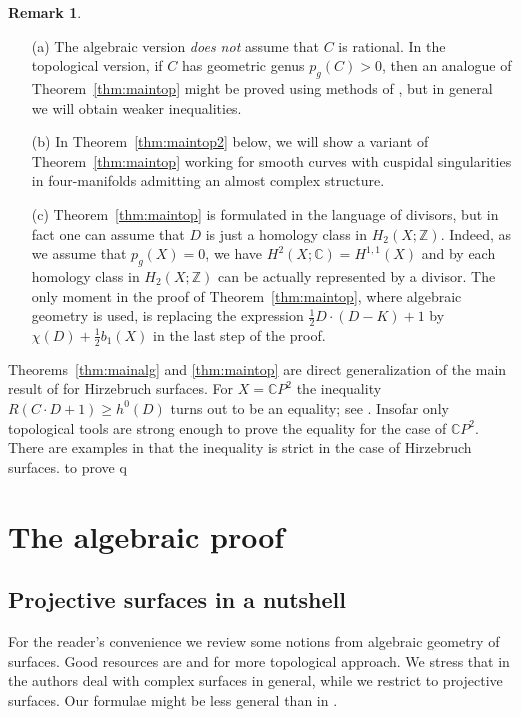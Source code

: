\documentclass[11pt]{amsart}
\numberwithin{equation}{section}
\theoremstyle{plain}
\theoremstyle{definition}
\newtheorem{remark}[equation]{Remark}
\begin{document}
\begin{remark}\label{rem:aftertop}\
\begin{itemize}
\item[(a)] The algebraic version \emph{does not} assume that $C$ is rational. 
In the topological version, if $C$ has geometric genus $p_g(C)>0$, then an analogue of Theorem~\ref{thm:maintop} might be proved
using methods of \cite{BCG,BHL}, but in general we will obtain weaker inequalities.
\item[(b)] 
In Theorem~\ref{thm:maintop2} below, we will show a variant of Theorem~\ref{thm:maintop} working for smooth curves with cuspidal singularities
in four-manifolds admitting an almost complex structure.
\item[(c)] Theorem~\ref{thm:maintop} is formulated in the language of divisors, but in fact one can assume that $D$ is just a homology class
in $H_2(X;{\mathbb Z})$. Indeed, as we assume that $p_g(X)=0$, we have $H^2(X;{\mathbb C})=H^{1,1}(X)$ 
and by \cite[Theorem IV.2.13]{BH} each homology class in $H_2(X;{\mathbb Z})$ can
be actually represented by a divisor. The only moment in the proof of Theorem~\ref{thm:maintop}, where algebraic geometry is used, is
replacing the expression $\frac12 D\cdot(D-K)+1$ by $\chi(D)+\frac12 b_1(X)$ in the last step of the proof.
\end{itemize}
\end{remark}

Theorems~\ref{thm:mainalg} and \ref{thm:maintop} are direct generalization of the main result of \cite{BM} for Hirzebruch surfaces.
For $X={\mathbb C} P^2$ the inequality $R(C\cdot D+1)\ge h^0(D)$ turns out to be an equality; see \cite{BL}. Insofar only topological tools are
strong enough to prove the equality for the case of ${\mathbb C} P^2$. There are examples in \cite{BM} that the inequality is strict in the case
of Hirzebruch surfaces.
to prove q
\section{The algebraic proof}
\subsection{Projective surfaces in a nutshell}\label{sec:algnut}
For the reader's convenience we review some notions from algebraic geometry of surfaces. Good resources are \cite{BH,GH} and
\cite{GS} for more topological approach. We stress that in \cite{BH} the authors deal with complex surfaces in general, while
we restrict to projective surfaces. Our formulae might be less general than in \cite{BH}.
\end{document}
